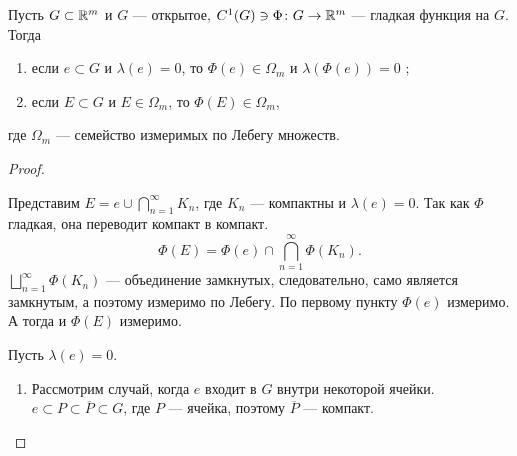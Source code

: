 \begin{thm}\label{th:save_measuring}
	Пусть $ G \subset \mathbb{R}^{m}$ и $ G$ --- открытое,  $ C^{1}(G) \ni \Phi\colon G \to \mathbb{R}^{m} $ --- гладкая функция на $ G$.
	Тогда
	\begin{enumerate}[noitemsep,label=(\arabic*),noitemsep]
		\item  если  $ e \subset G$ и $ \lambda (e) = 0$, то $ \Phi(e) \in \Omega _{m}$ и $ \lambda (\Phi(e)) = 0$ ;
		\item если $ E \subset G$ и $ E \in \Omega _{m}$, то $ \Phi(E) \in \Omega _{m}$,
	\end{enumerate}
	где $ \Omega _{m}$ --- семейство измеримых по Лебегу множеств.
\end{thm}
\begin{proof}
	~\begin{description}
		\item {}
			Представим $ E = e \cup \bigcap_{n=1}^{\infty} K_n$, где $ K_n$ --- компактны и $ \lambda (e) = 0$.
			Так как $ \Phi$ гладкая, она переводит компакт в компакт.
			\[
				\Phi(E)  =\Phi(e) \cap \bigcap_{n=1}^{\infty} \Phi(K_n)
			.\]
			$ \bigsqcup\limits_{n=1}^{\infty} \Phi(K_n)$ --- объединение замкнутых, следовательно, само является замкнутым, а поэтому измеримо по Лебегу.
			По первому пункту $ \Phi(e) $ измеримо. А тогда и $ \Phi(E)$ измеримо.
		\item {} Пусть $ \lambda (e) = 0$.
			\begin{enumerate}
				\item Рассмотрим случай, когда $ e$ входит в $ G$ внутри некоторой ячейки.
					$ e \subset P\subset \overline{P} \subset G$, где $ P$ --- ячейка, поэтому $ \overline{P}$ --- компакт.


\end{enumerate}
\end{description}
\end{proof}
